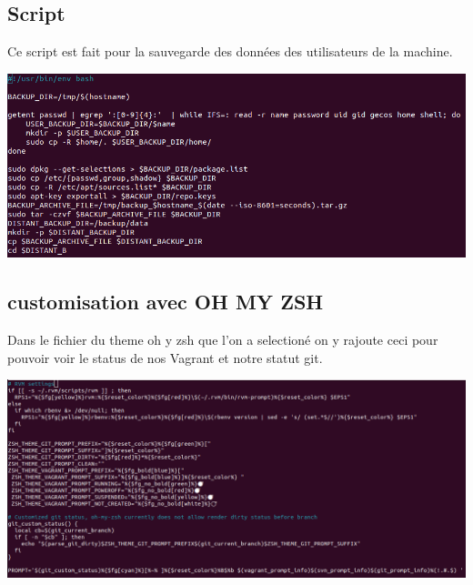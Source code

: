 \documentclass{article}
\begin{document}
 \subsection{\large{Script}}
 Ce script est fait pour la sauvegarde des données des utilisateurs de la machine.
 
 \begin{center}
        \includegraphics[scale=0.5]{Images/save.png}
 \end{center}
    
 
 \newpage
 
 
 \subsection{\large{customisation avec OH MY ZSH}}
 Dans le fichier du theme oh y zsh que l'on a selectioné on y rajoute ceci pour pouvoir voir le status de nos Vagrant et notre statut git.
 
 \begin{center}
        \includegraphics[scale=0.43]{Images/theme.png}
 \end{center}
    
 
\end{document}
